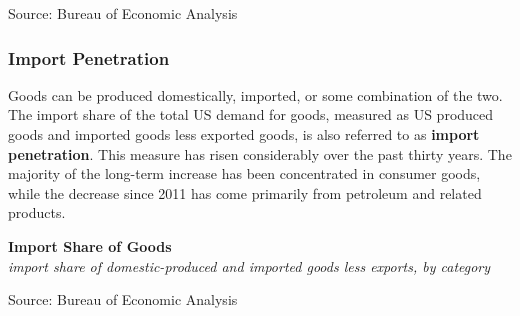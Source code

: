 \documentclass{report}
\makeatletter
\newcommand{\tbllink}[1]{\href{https://raw.githubusercontent.com/bdecon/US-chartbook/master/chartbook/data/#1}{\faTable}}
\newcommand*\short[1]{\expandafter\@gobbletwo\number\numexpr#1\relax}
\newcommand{\sbar}[4]{
		\addplot[ybar stacked, bar width=2.3pt, draw opacity=0, fill=#1] 
			table [x=#2, y=#3, col sep=comma]{#4};}
\newcommand{\dateaxisticks}{
		date coordinates in=x, axis line style={draw=none},
		xmax={2024-01-31},
		max space between ticks=40,	    
		xtick={{1990-01-01}, {1992-01-01}, {1994-01-01}, 
			{1996-01-01}, {1998-01-01}, {2000-01-01}, 
			{2002-01-01}, {2004-01-01}, {2006-01-01},
			{2008-01-01}, {2010-01-01}, {2012-01-01}, {2014-01-01},
		    {2016-01-01}, {2018-01-01}, {2020-01-01}, {2022-01-01}, 
		    {2024-01-01}, {2026-01-01}},
		minor xtick={{1989-01-01}, {1991-01-01}, {1993-01-01},
			{1995-01-01}, {1997-01-01}, {1999-01-01}, 
			{2001-01-01}, {2003-01-01}, {2005-01-01}, {2007-01-01},
		    {2009-01-01}, {2011-01-01}, {2013-01-01}, {2015-01-01},
		    {2017-01-01}, {2019-01-01}, {2021-01-01}, {2023-01-01}, 
		    {2025-01-01}, {2027-01-01}},
		enlarge y limits={0.06}, enlarge x limits={0.01},
		xticklabel style={align=center, yshift=-2pt}, tick label style={inner sep=0pt},
		}
\newcommand{\bbar}[2]{extra #1 ticks = {{#2}}, extra #1 tick labels = ,
		extra #1 tick style = {grid=major, grid style={thick, black!25}},}
\newcommand{\rbars}{
		\fill[color=black!10] (axis cs:{1990-07-01},\pgfkeysvalueof{/pgfplots/ymin})
			rectangle (axis cs:{1991-03-01}, \pgfkeysvalueof{/pgfplots/ymax});
		\fill[color=black!10] (axis cs:{2007-12-01},\pgfkeysvalueof{/pgfplots/ymin})
			rectangle (axis cs:{2009-07-01}, \pgfkeysvalueof{/pgfplots/ymax});
		\fill[color=black!10] (axis cs:{2001-03-01},\pgfkeysvalueof{/pgfplots/ymin})
			rectangle (axis cs:{2001-11-01}, \pgfkeysvalueof{/pgfplots/ymax});
		\fill[color=black!10] (axis cs:{2020-02-01},\pgfkeysvalueof{/pgfplots/ymin})
			rectangle (axis cs:{2020-05-01}, \pgfkeysvalueof{/pgfplots/ymax});}
\makeatother
\begin{document}
{\begin{minipage}{1.0\textwidth}
{\footnotesize{Source: Bureau of Economic Analysis} \hfill \tbllink{exim.csv}}
\end{minipage}
\newpage
\begin{minipage}{1.0\textwidth}  
\subsubsection*{Import Penetration} 
\small Goods can be produced domestically, imported, or some combination of the two. The import share of the total US demand for goods, measured as US produced goods and imported goods less exported goods, is also referred to as \textbf{import penetration}. This measure has risen considerably over the past thirty years. The majority of the long-term increase has been concentrated in consumer goods, while the decrease since 2011 has come primarily from petroleum and related products. 

 


\vspace{1mm}

\normalsize \textbf{Import Share of Goods}\\
\footnotesize{\textit{import share of domestic-produced and imported goods less exports, by category}}
\vspace{4.6cm}

\hspace{2mm} 

\footnotesize{Source: Bureau of Economic Analysis} \hfill \tbllink{goodsimpsh.csv}
\end{minipage}
\newpage
\vspace*{-10mm}

}
\end{document}
